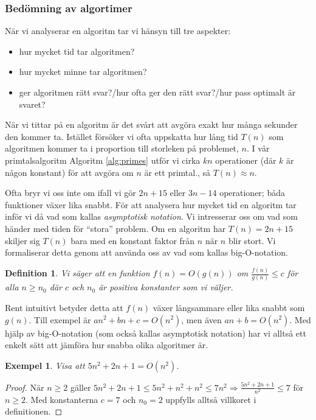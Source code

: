 \documentclass[10pt,a4paper]{article}
\newtheorem{defn}{Definition}
\theoremstyle{problem}
\newtheorem{example}{Exempel}
\begin{document}
\subsubsection*{Bedömning av algortimer}
När vi analyserar en algoritm tar vi hänsyn till tre aspekter:
\begin{itemize}
\item{hur mycket tid tar algoritmen?}
\item{hur mycket minne tar algoritmen?}
\item{ger algoritmen rätt svar?/hur ofta ger den rätt svar?/hur pass optimalt är svaret?}
\end{itemize}
När vi tittar på en algoritm är det svårt att avgöra exakt hur många sekunder den kommer ta. Istället försöker vi ofta uppskatta hur lång tid $T(n)$ som
algoritmen kommer ta i proportion till storleken på problemet, $n$. I vår primtalsalgoritm Algoritm \ref{alg:primes} utför vi cirka $kn$ operationer (där $k$ är någon
konstant) för att avgöra om $n$ är ett primtal., så $T(n) \approx n$.

Ofta bryr vi oss inte om ifall vi gör $2n + 15$ eller $3n - 14$ operationer; båda funktioner växer lika snabbt. För att analysera hur mycket tid en algoritm tar inför vi då vad som kallas \emph{asymptotisk notation}. Vi intresserar oss om vad som händer med tiden för ``stora'' problem. Om en algoritm har $T(n) = 2n+15$ skiljer sig $T(n)$
bara med en konstant faktor från $n$ när $n$ blir stort. Vi formaliserar detta genom att använda oss av vad som kallas big-O-notation.

\begin{defn}
Vi säger att en funktion $f(n) = O(g(n))$ om $\frac{f(n)}{g(n)} \le c$ för alla $n \ge n_0$ där $c$ och $n_0$ är positiva konstanter som vi väljer.
\end{defn}

Rent intuitivt betyder detta att $f(n)$ växer långsammare eller lika snabbt som $g(n)$. Till exempel är $an^2 + bn + c = O(n^2)$, men även $an + b = O(n^2)$.
Med hjälp av big-O-notation (som också kallas asymptotisk notation) har vi alltså ett enkelt sätt att jämföra hur snabba olika algoritmer är.

\begin{example}
Visa att $5n^2 + 2n + 1 = O(n^2)$.
\end{example}
\begin{proof}
När $n \ge 2$ gäller $5n^2 + 2n + 1 \le 5n^2 + n^2 + n^2 \le 7n^2 \Rightarrow \frac{5n^2 + 2n + 1}{n^2} \le 7$ för $n \ge 2$. Med konstanterna $c = 7$ och $n_0 = 2$
uppfylls alltså villkoret i definitionen.
\end{proof}
\end{document}
